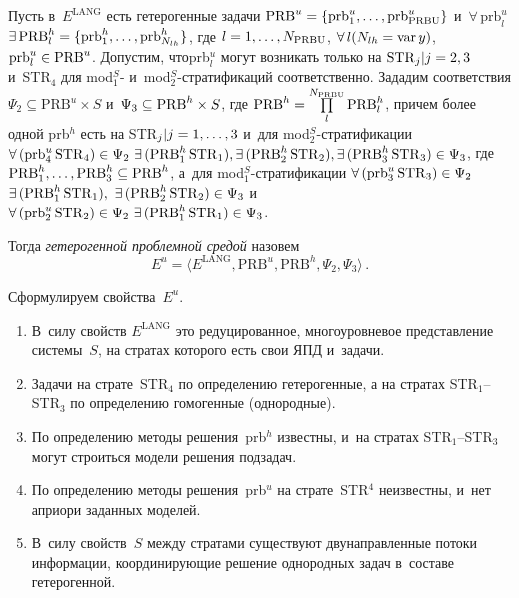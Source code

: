 \begin{multicols}{2}
  Пусть в~$E^{\mathrm{LANG}}$ есть гетерогенные задачи $\mathrm{PRB}^u\hm= \{ 
\mathrm{prb}_1^u, \ldots, \mathrm{prb}^u_{\mathrm{PRBU}}\}$ и~$\forall\, \mathrm{prb}_l^u$
$\exists\, 
\mathrm{PRB}_l^h\hm= \{ \mathrm{prb}_1^h, \ldots , \mathrm{prb}^h_{N_{lh}}\}$, где $l\hm= 
1,\ldots, N_{\mathrm{PRBU}}$, $\forall\,l (N_{lh}\hm= \mathrm{var}\,y)$, $\mathrm{prb}_l^u\hm\in 
\mathrm{PRB}^u$. Допустим, что\linebreak prb$_l^u$ могут возникать только на $\mathrm{STR}_j\vert 
j\hm= 2,3$ и~STR$_4$ для mod$_1^S$- и~mod$_2^S$-стра\-ти\-фи\-ка\-ций соответственно. 
Зададим соответствия $\Psi_2\subseteq \mathrm{PRB}^u\times {S}$ 
и~$\Psi_3\hm\subseteq \mathrm{PRB}^h\times {S}$, где $\mathrm{PRB}^h\hm= 
  \prod\limits_l^{N_{\mathrm{PRBU}}} \mathrm{PRB}_l^h$, причем более одной  
prb$^h$ есть на STR$_j\vert j\hm= 1,\ldots, 3$  
и~для  
mod$_2^S$-стра\-ти\-фи\-ка\-ции  
$\forall\,  
(\mathrm{prb}_4^u\,\mathrm{STR}_4)\hm\in \Psi_2 \
\exists\, (\mathrm{PRB}_1^h\,\mathrm{STR}_1),
  \exists\, (\mathrm{PRB}_2^h\,\mathrm{STR}_2),\linebreak
  \exists\, (\mathrm{PRB}_3^h\,\mathrm{STR}_3)\hm\in \Psi_3$, где $\mathrm{PRB}_1^h,\ldots, 
\mathrm{PRB}_3^h\hm\subseteq \mathrm{PRB}^h$, а~для mod$_1^S$-стра\-ти\-фи\-ка\-ции 
$\forall\, (\mathrm{prb}_3^u\,\mathrm{STR}_3)\hm\in \Psi_2$\ %
$\exists\, 
(\mathrm{PRB}_1^h\,\mathrm{STR}_1),\ \exists\, (\mathrm{PRB}_2^h\,\mathrm{STR}_2)\hm\in 
\Psi_3$ %
и~$\forall\, (\mathrm{prb}^u_2\,\mathrm{STR}_2)\hm\in \Psi_2\ \exists\, 
(\mathrm{PRB}_1^h\,\mathrm{STR}_1)\hm\in \Psi_3$. 
  
  Тогда \textit{гетерогенной проблемной средой} назовем
  \begin{equation}
  E^u =\langle E^{\mathrm{LANG}}, \mathrm{PRB}^u, \mathrm{PRB}^h, \Psi_2,\Psi_3\rangle\,.
  \end{equation}
    
  Сформулируем свойства~$E^u$. 
  \begin{enumerate}[1.]
  \item  В~силу свойств $E^{\mathrm{LANG}}$ это редуцированное, многоуровневое 
представление системы~$S$, на стратах которого есть свои ЯПД и~задачи. 
  \item  Задачи на страте~STR$_4$ по определению гетерогенные, а на стратах 
STR$_1$--STR$_3$ по определению гомогенные (однородные).
  \item По определению методы решения~prb$^h$ известны, и~на стратах 
STR$_1$--STR$_3$ могут строиться модели решения подзадач. 
  \item По определению методы решения~prb$^u$ на страте~STR$^4$ неизвестны, и~нет 
априори заданных моделей.
  \item В~силу свойств~${S}$ между стратами существуют двунаправленные потоки 
информации, координирующие решение однородных задач в~составе гетерогенной. 
  \end{enumerate}
  

\end{multicols}
